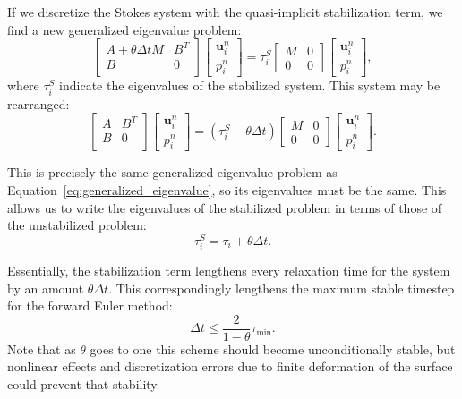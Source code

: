 \documentclass[preprint,12pt,authoryear]{elsarticle}
\begin{document}
If we discretize the Stokes system with the quasi-implicit stabilization term, we find
a new generalized eigenvalue problem:
\begin{equation}
\begin{bmatrix}
A + \theta \Delta t M & B^T \\
B & 0 \\
\end{bmatrix}
\begin{bmatrix}
\mathbf{u}^n_i \\
p^n_i
\end{bmatrix}
=
\tau^S_i
\begin{bmatrix}
M & 0 \\
0 & 0
\end{bmatrix}
\begin{bmatrix}
\mathbf{u}^n_i \\
p^n_i
\end{bmatrix},
\label{eq:stabilized_generalized_eigenvalue}
\end{equation}
where $\tau^S_i$ indicate the eigenvalues of the stabilized system.
This system may be rearranged:
\begin{equation}
\begin{bmatrix}
A & B^T \\
B & 0 \\
\end{bmatrix}
\begin{bmatrix}
\mathbf{u}^n_i \\
p^n_i
\end{bmatrix}
=
\left(\tau^S_i - \theta \Delta t \right)
\begin{bmatrix}
M & 0 \\
0 & 0
\end{bmatrix}
\begin{bmatrix}
\mathbf{u}^n_i \\
p^n_i
\end{bmatrix}.
\label{eq:rearranged_stabilized_generalized_eigenvalue}
\end{equation}

This is precisely the same generalized eigenvalue problem as Equation~\eqref{eq:generalized_eigenvalue},
so its eigenvalues must be the same.  This allows us to write the eigenvalues of the stabilized problem in
terms of those of the unstabilized problem:
\begin{equation}
\tau^S_i = \tau_i + \theta \Delta t.
\label{eq:spectrum_shift}
\end{equation}

Essentially, the stabilization term lengthens every relaxation time for the system by an amount $\theta \Delta t$.
This correspondingly lengthens the maximum stable timestep for the forward Euler method:
\begin{equation}
\Delta t  \le \frac{2}{1-\theta} \tau_{\mathrm{min}}.
\label{eq:cfl_euler_stabilized}
\end{equation}
Note that as $\theta$ goes to one this scheme should become unconditionally stable,
but nonlinear effects and discretization errors due to finite deformation of the surface could 
prevent that stability.
\end{document}
